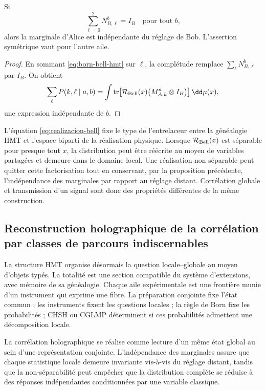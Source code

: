 \begin{proposition}
\label{prop:no-signaling-hmt}
Si
\[
 \sum_{\ell=0}^{2}N_{B,\ell}^{b}=I_B
 \quad\text{pour tout }b,
\]
alors la marginale d’Alice est indépendante du réglage de Bob. L’assertion symétrique vaut pour l’autre aile.
\end{proposition}

\begin{proof}
En sommant \eqref{eq:born-bell-hmt} sur \(\ell\), la complétude remplace \(\sum_\ell N_{B,\ell}^{b}\) par \(I_B\). On obtient
\[
 \sum_{\ell}P(k,\ell\mid a,b)
 =\int\operatorname{tr}\!\left[
   \mathcal R_{\rm Bell}(x)
   \bigl(M_{A,k}^{a}\otimes I_B\bigr)
  \right]\dd\mu(x),
\]
une expression indépendante de \(b\).
\end{proof}

L’équation \eqref{eq:realizacion-bell} fixe le type de l’entrelaceur entre la généalogie HMT et l’espace biparti de la réalisation physique. Lorsque \(\mathcal R_{\rm Bell}(x)\) est séparable pour presque tout \(x\), la distribution peut être réécrite au moyen de variables partagées et demeure dans le domaine local. Une réalisation non séparable peut quitter cette factorisation tout en conservant, par la proposition précédente, l’indépendance des marginales par rapport au réglage distant. Corrélation globale et transmission d’un signal sont donc des propriétés différentes de la même construction.

\subsection{Reconstruction holographique de la corrélation par classes de parcours indiscernables}

La structure HMT organise désormais la question locale--globale au moyen d’objets typés. La totalité est une section compatible du système d’extensions, avec mémoire de sa généalogie. Chaque aile expérimentale est une frontière munie d’un instrument qui exprime une fibre. La préparation conjointe fixe l’état commun ; les instruments fixent les questions locales ; la règle de Born fixe les probabilités ; CHSH ou CGLMP déterminent si ces probabilités admettent une décomposition locale.

La corrélation holographique se réalise comme lecture d’un même état global au sein d’une représentation conjointe. L’indépendance des marginales assure que chaque statistique locale demeure invariante vis-à-vis du réglage distant, tandis que la non-séparabilité peut empêcher que la distribution complète se réduise à des réponses indépendantes conditionnées par une variable classique.

